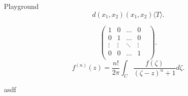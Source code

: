 \documentclass[class=article, crop=false]{standalone}
\begin{document}
\begin{zettel}{Playground}
\[
    d(x_1,x_2) (x_1,x_2) \langle T\rangle 
.\]

\[
    \begin{pmatrix}
    1       & 0       &  \dots  & 0 \\
    0       & 1       &  \dots  & 0 \\
     \vdots &  \vdots &  \ddots &  \vdots &  \\
    0       & 0       &  \dots  & 1 \\
    \end{pmatrix}
.\]
\[
f ^{(n)}(z) =  \frac{n!}{2 \pi } \int_{C}^{} \frac{f (\zeta)}{(\zeta-z)^n+1 } d \zeta
.\]


asdf
\end{zettel}
\end{document}

